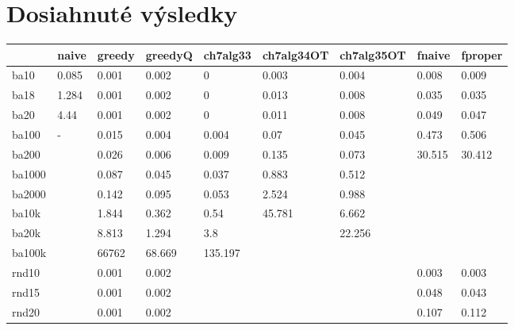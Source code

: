 \chapter{Dosiahnuté výsledky}\label{chap:vysledky}



\begin{table}[h]
	\begin{tabular}{lllllllll}
		\hline
		& naive & greedy & greedyQ & ch7alg33 & ch7alg34OT & ch7alg35OT & fnaive   & fproper \\ \hline
		ba10    & 0.085 & 0.001  & 0.002   & 0        & 0.003      & 0.004      & 0.008    & 0.009   \\
		ba18    & 1.284 & 0.001  & 0.002   & 0        & 0.013      & 0.008      & 0.035    & 0.035   \\
		ba20    & 4.44  & 0.001  & 0.002   & 0        & 0.011      & 0.008      & 0.049    & 0.047   \\
		ba100   & -     & 0.015  & 0.004   & 0.004    & 0.07       & 0.045      & 0.473    & 0.506   \\
		ba200   &       & 0.026  & 0.006   & 0.009    & 0.135      & 0.073      & 30.515   & 30.412  \\
		ba1000  &       & 0.087  & 0.045   & 0.037    & 0.883      & 0.512      &          &         \\
		ba2000  &       & 0.142  & 0.095   & 0.053    & 2.524      & 0.988      &          &         \\
		ba10k   &       & 1.844  & 0.362   & 0.54     & 45.781     & 6.662      &          &         \\
		ba20k   &       & 8.813  & 1.294   & 3.8      &            & 22.256     &          &         \\
		ba100k  &       & 66762  & 68.669  & 135.197  &            &            &          &         \\
		rnd10   &       & 0.001  & 0.002   &          &            &            & 0.003    & 0.003   \\
		rnd15   &       & 0.001  & 0.002   &          &            &            & 0.048    & 0.043   \\
		rnd20   &       & 0.001  & 0.002   &          &            &            & 0.107    & 0.112   \\

\end{tabular}
\end{table}
